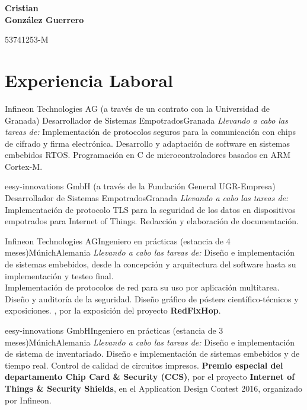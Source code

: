 \documentclass[11pt,a4paper,sans,spanish]{moderncv}
\newcommand{\colorhref}[3][color1]{\href{#2}{\color{#1}{\underline{#3}}}}
\begin{document}
\begin{minipage}[c]{\textwidth-110pt-0.2em}
    \begin{flushright}
        \textbf{\Huge{Cristian\\\vspace{4pt}González Guerrero}}

        \vspace{4pt}
        \small{53741253-M}
    \end{flushright}
\end{minipage}
\vspace{-5em}

\makecvtitle

\section{Experiencia Laboral}

{Infineon Technologies AG (a través de un contrato con la Universidad de Granada)}
{Desarrollador de Sistemas Empotrados}{Granada}{}
{\emph{Llevando a  cabo las tareas de:} Implementación de protocolos seguros para la comunicación con chips de cifrado y firma electrónica.
Desarrollo y adaptación de software en sistemas embebidos RTOS.
Programación en C de microcontroladores basados en ARM Cortex-M.
}

{eesy-innovations GmbH (a través de la Fundación General UGR-Empresa)}
{Desarrollador de Sistemas Empotrados}{Granada}{}
{\emph{Llevando a  cabo las tareas de:} Implementación de protocolo TLS para la seguridad de los datos en dispositivos empotrados para Internet of Things.
Redacción y elaboración de documentación.
}

{Infineon Technologies AG}{Ingeniero en prácticas (estancia de 4 meses)}{Múnich}{Alemania}
{\emph{Llevando a  cabo las tareas de:} Diseño e implementación de sistemas embebidos, desde la concepción y arquitectura del software hasta su implementación y testeo final.\\
Implementación de protocolos de red para su uso por aplicación multitarea.
Diseño y auditoría de la seguridad.
Diseño gráfico de pósters científico-técnicos y exposiciones.
\colorhref{http://secon2016.ieee-secon.org/content/demos-session}{Premio a la mejor demo (IEEE SECON 2016)}, por la exposición del proyecto \textbf{RedFixHop}.
}

{eesy-innovations GmbH}{Ingeniero en prácticas (estancia de 3 meses)}{Múnich}{Alemania}
{\emph{Llevando a  cabo las tareas de:} Diseño e implementación de sistema de inventariado.
Diseño e implementación de sistemas embebidos y de tiempo real.
Control de calidad de circuitos impresos.
\textbf{Premio especial del departamento Chip Card \& Security (CCS)}, por el proyecto \textbf{Internet of Things \& Security Shields}, en el Application Design Contest 2016, organizado por Infineon.}
\end{document}
